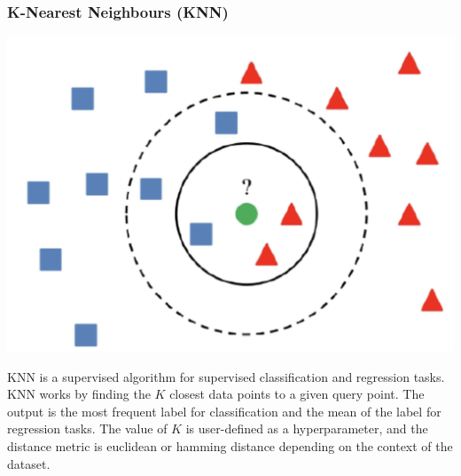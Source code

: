 \documentclass[a4paper, 12pt]{article}
\begin{document}
\vskip 0.2in
\subsubsection{K-Nearest Neighbours (KNN)}
\begin{center}
\includegraphics[scale=0.48]{knn - paper.png}
\label{fig:knn}
\end{center}
\noindent KNN is a supervised algorithm for supervised classification and regression tasks. KNN works by finding the \(K\) closest data points to a given query point. The output is the most frequent label for classification and the mean of the label for regression tasks. The value of \(K\) is user-defined as a hyperparameter, and the distance metric is euclidean or hamming distance depending on the context of the dataset.

\vskip 0.2in
\end{document}
